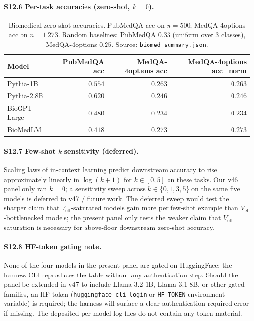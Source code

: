 \documentclass[11pt,a4paper]{article}
\begin{document}
\paragraph{S12.6 Per-task accuracies (zero-shot, $k\!=\!0$).}
\begin{table}[h]
\centering
\small
\caption{Biomedical zero-shot accuracies. PubMedQA acc on
$n\!=\!500$; MedQA-4options acc on $n\!=\!1\,273$. Random baselines:
PubMedQA $0.33$ (uniform over 3 classes), MedQA-4options $0.25$.
Source: \texttt{biomed\_summary.json}.}
\label{tab:S12-accs}
\begin{tabular}{lrrr}
\toprule
Model           & PubMedQA acc & MedQA-4options acc & MedQA-4options acc\_norm \\
\midrule
Pythia-1B       & $0.554$ & $0.263$ & $0.263$ \\
Pythia-2.8B     & $0.620$ & $0.246$ & $0.246$ \\
BioGPT-Large    & $0.480$ & $0.234$ & $0.234$ \\
BioMedLM        & $0.418$ & $0.273$ & $0.273$ \\
\bottomrule
\end{tabular}
\end{table}

\paragraph{S12.7 Few-shot $k$ sensitivity (deferred).}
Scaling laws of in-context learning predict downstream accuracy to
rise approximately linearly in $\log(k\!+\!1)$ for $k\!\in\![0,5]$
on these tasks. Our v46 panel only ran $k\!=\!0$; a sensitivity
sweep across $k\!\in\!\{0, 1, 3, 5\}$ on the same five models is
deferred to v47 / future work. The deferred sweep would test the
sharper claim that $V_\mathrm{eff}$-saturated models gain more
per few-shot example than $V_\mathrm{eff}$-bottlenecked models;
the present panel only tests the weaker claim that
$V_\mathrm{eff}$ saturation is necessary for above-floor
downstream zero-shot accuracy.

\paragraph{S12.8 HF-token gating note.}
None of the four models in the present panel are gated on
HuggingFace; the harness CLI reproduces the table without any
authentication step. Should the panel be extended in v47 to
include Llama-3.2-1B, Llama-3.1-8B, or other gated families, an
HF token (\texttt{huggingface-cli login} or \texttt{HF\_TOKEN}
environment variable) is required; the harness will surface a
clear authentication-required error if missing. The deposited
per-model log files do not contain any token material.
\end{document}
